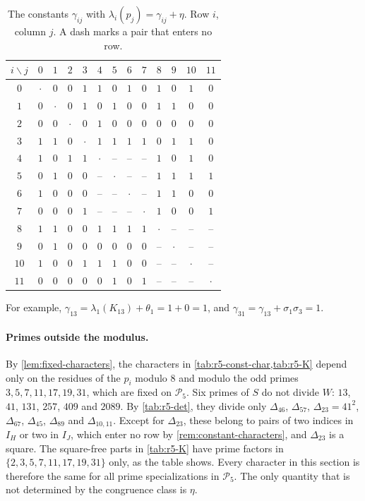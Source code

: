 \documentclass[12pt,oneside,openany]{book}
\theoremstyle{definition}
\theoremstyle{plain}
\numberwithin{equation}{chapter}
\theoremstyle{plain}
\theoremstyle{definition}
\theoremstyle{remark}
\newcommand{\cP}{\mathcal P}
\begin{document}
\begin{table}[htbp]
\centering
\caption{The constants $\gamma_{ij}$ with $\lambda_i(p_j)=\gamma_{ij}+\eta$. Row $i$, column $j$. A dash marks a pair that enters no row.}\label{tab:r5-cross}
\begin{tabular}{c*{12}{c}}
\toprule
$i\backslash j$ & $0$ & $1$ & $2$ & $3$ & $4$ & $5$ & $6$ & $7$ & $8$ & $9$ & $10$ & $11$\\
\midrule
$0$ & $\cdot$ & $0$ & $0$ & $1$ & $1$ & $0$ & $1$ & $0$ & $1$ & $0$ & $1$ & $0$ \\
$1$ & $0$ & $\cdot$ & $0$ & $1$ & $0$ & $1$ & $0$ & $0$ & $1$ & $1$ & $0$ & $0$ \\
$2$ & $0$ & $0$ & $\cdot$ & $0$ & $1$ & $0$ & $0$ & $0$ & $0$ & $0$ & $0$ & $0$ \\
$3$ & $1$ & $1$ & $0$ & $\cdot$ & $1$ & $1$ & $1$ & $1$ & $0$ & $1$ & $1$ & $0$ \\
\midrule
$4$ & $1$ & $0$ & $1$ & $1$ & $\cdot$ & -- & -- & -- & $1$ & $0$ & $1$ & $0$ \\
$5$ & $0$ & $1$ & $0$ & $0$ & -- & $\cdot$ & -- & -- & $1$ & $1$ & $1$ & $1$ \\
$6$ & $1$ & $0$ & $0$ & $0$ & -- & -- & $\cdot$ & -- & $1$ & $1$ & $0$ & $0$ \\
$7$ & $0$ & $0$ & $0$ & $1$ & -- & -- & -- & $\cdot$ & $1$ & $0$ & $0$ & $1$ \\
\midrule
$8$ & $1$ & $1$ & $0$ & $0$ & $1$ & $1$ & $1$ & $1$ & $\cdot$ & -- & -- & -- \\
$9$ & $0$ & $1$ & $0$ & $0$ & $0$ & $0$ & $0$ & $0$ & -- & $\cdot$ & -- & -- \\
$10$ & $1$ & $0$ & $0$ & $1$ & $1$ & $1$ & $0$ & $0$ & -- & -- & $\cdot$ & -- \\
$11$ & $0$ & $0$ & $0$ & $0$ & $0$ & $1$ & $0$ & $1$ & -- & -- & -- & $\cdot$ \\
\bottomrule
\end{tabular}
\end{table}

For example, $\gamma_{13}=\lambda_1(K_{13})+\theta_1=1+0=1$, and $\gamma_{31}=\gamma_{13}+\sigma_1\sigma_3=1$.

\paragraph{Primes outside the modulus.} By \cref{lem:fixed-characters}, the characters in \cref{tab:r5-const-char,tab:r5-K} depend only on the residues of the $p_i$ modulo $8$ and modulo the odd primes $3,5,7,11,17,19,31$, which are fixed on $\cP_5$. Six primes of $S$ do not divide $W$: $13$, $41$, $131$, $257$, $409$ and $2089$. By \cref{tab:r5-det}, they divide only $\Delta_{46}$, $\Delta_{57}$, $\Delta_{23}=41^2$, $\Delta_{67}$, $\Delta_{45}$, $\Delta_{89}$ and $\Delta_{10,11}$. Except for $\Delta_{23}$, these belong to pairs of two indices in $I_H$ or two in $I_J$, which enter no row by \cref{rem:constant-characters}, and $\Delta_{23}$ is a square. The square-free parts in \cref{tab:r5-K} have prime factors in $\{2,3,5,7,11,17,19,31\}$ only, as the table shows. Every character in this section is therefore the same for all prime specializations in $\cP_5$. The only quantity that is not determined by the congruence class is $\eta$.
\end{document}
